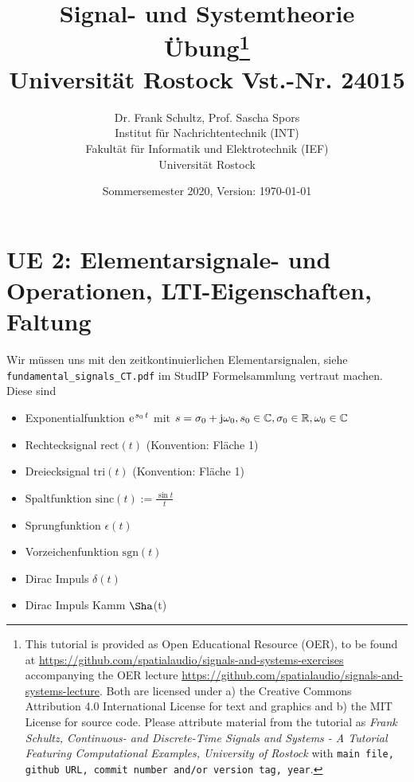 \documentclass[11pt,a4paper,DIV=12]{scrartcl}
\title{Signal- und Systemtheorie\\
Übung\thanks{
This tutorial is provided as Open Educational Resource (OER), to be found at
\url{https://github.com/spatialaudio/signals-and-systems-exercises}
accompanying the OER lecture
\url{https://github.com/spatialaudio/signals-and-systems-lecture}.
%
Both are licensed under a) the Creative Commons Attribution 4.0 International
License for text and graphics and b) the MIT License for source code.
%
Please attribute material from the tutorial as \textit{Frank Schultz,
Continuous- and Discrete-Time Signals and Systems - A Tutorial Featuring
Computational Examples, University of Rostock} with
\texttt{main file, github URL, commit number and/or version tag, year}.
}
\\
\small Universität Rostock Vst.-Nr. 24015}
\author{Dr. Frank Schultz, Prof. Sascha Spors\\
\small Institut für Nachrichtentechnik (INT)\\
\small Fakultät für Informatik und Elektrotechnik (IEF)\\
\small Universität Rostock
}
\date{Sommersemester 2020, Version: \today}
\numberwithin{equation}{section}
\numberwithin{figure}{section}
\begin{document}
\maketitle
\tableofcontents

%


\setcounter{section}{1}

\newpage
\section{UE 2: Elementarsignale- und Operationen, LTI-Eigenschaften, Faltung}

Wir müssen uns mit den zeitkontinuierlichen Elementarsignalen, siehe \verb|fundamental_signals_CT.pdf|
im StudIP Formelsammlung vertraut machen. Diese sind

\begin{itemize}
  \item Exponentialfunktion
  $\e^{s_0 \, t}$ mit $s=\sigma_0 + \im\omega_0, s_0\in\mathbb{C}, \sigma_0\in\mathbb{R}, \omega_0\in\mathbb{C}$
  \item Rechtecksignal $\mathrm{rect}(t)$ (Konvention: Fläche 1)
  \item Dreiecksignal $\mathrm{tri}(t)$  (Konvention: Fläche 1)
  \item Spaltfunktion $\mathrm{sinc}(t):=\frac{\sin t}{t}$
  \item Sprungfunktion $\epsilon(t)$
  \item Vorzeichenfunktion $\mathrm{sgn}(t)$
  \item Dirac Impuls $\delta(t)$
  \item Dirac Impuls Kamm $\Sha$(t)
\end{itemize}








\newpage
\end{document}

